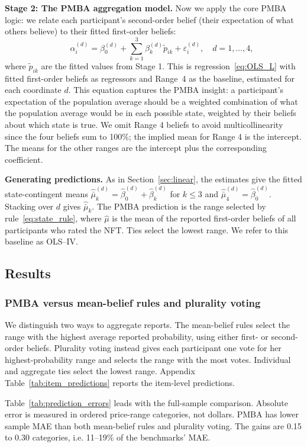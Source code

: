 \documentclass[12pt,reqno]{amsart}
\begin{document}
\textbf{Stage 2: The PMBA aggregation model.} Now we apply the core PMBA logic: we relate each participant's second-order belief (their expectation of what others believe) to their fitted first-order beliefs:
\[
\qquad \alpha_i^{(d)} = \beta_0^{(d)} + \sum_{k=1}^3 \beta_k^{(d)} \tilde p_{ik} + \varepsilon_i^{(d)},\quad d=1,\ldots,4,
\]
where  $\tilde p_{ik}$ are the fitted values from Stage 1. This is regression~\eqref{eq:OLS_L} with fitted first-order beliefs as regressors and Range~4 as the baseline, estimated for each coordinate $d$. This equation captures the PMBA insight: a participant's expectation of the population average should be a weighted combination of what the population average would be in each possible state, weighted by their beliefs about which state is true. We omit Range 4 beliefs to avoid multicollinearity since the four beliefs sum to 100\%; the implied mean for Range 4 is the intercept. The means for the other ranges are the intercept plus the corresponding coefficient.

\textbf{Generating predictions.} As in Section~\ref{sec:linear}, the estimates give the fitted state-contingent means $\widehat{\bar\mu}_k^{(d)}=\hat\beta_0^{(d)}+\hat\beta_k^{(d)}$ for $k\le3$ and $\widehat{\bar\mu}_4^{(d)}=\hat\beta_0^{(d)}$. Stacking over $d$ gives $\widehat{\bar\mu}_k$. The PMBA prediction is the range selected by rule~\eqref{eq:state_rule}, where $\hat\mu$ is the mean of the reported first-order beliefs of all participants who rated the NFT. Ties select the lowest range. We refer to this baseline as OLS--IV.

\subsection{Results}
\subsubsection{PMBA versus mean-belief rules and plurality voting}
We distinguish two ways to aggregate reports. The mean-belief rules select the range with the highest average reported probability, using either first- or second-order beliefs. Plurality voting instead gives each participant one vote for her highest-probability range and selects the range with the most votes. Individual and aggregate ties select the lowest range. Appendix Table~\ref{tab:item_predictions} reports the item-level predictions.

Table~\ref{tab:prediction_errors} leads with the full-sample comparison. Absolute error is measured in ordered price-range categories, not dollars. PMBA has lower sample MAE than both mean-belief rules and plurality voting.  The gains are 0.15 to 0.30 categories, i.e. 11--19\% of the benchmarks' MAE.
\end{document}
